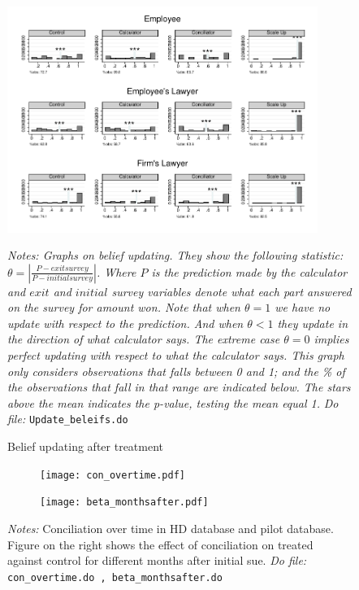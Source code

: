 \documentclass[11pt]{article}
\begin{document}
\begin{figure}[H]
    \caption{Belief updating after treatment}
    \label{Figure_updating}
     \begin{center}
        \includegraphics[width=0.9\textwidth]{updatebeleif_amount.pdf}
        \end{center}
     \footnotesize \textit{Notes: Graphs on belief updating. They show the following statistic: $\theta=\left|\frac{P-exitsurvey}{P-initialsurvey}\right|$. Where $P$ is the prediction made by the calculator and $exit$ and $initial$ survey variables denote what each part answered on the survey for amount won. Note that when $\theta=1$ we have no update with respect to the prediction. And when $\theta<1$ they update in the direction of what calculator says. The extreme case $\theta=0$ implies perfect updating with respect to what the calculator says. This graph only considers observations that falls between 0 and 1; and the \% of the observations that fall in that range are indicated below. The stars above the mean indicates the p-value, testing the mean equal 1.} 
      \footnotesize{ \textit{Do file: }  \texttt{Update\_beleifs.do}}
\end{figure}



      
\begin{figure}[H]
    \caption{Conciliation over time}
    \label{Figure_dynamicsConciliation}
    \begin{center}
    \begin{subfigure}{0.49\textwidth}
    \centering
        \texttt{[image: con\_overtime.pdf]}
     \end{subfigure}
        \begin{subfigure}{0.49\textwidth}    
         \centering
        \texttt{[image: beta\_monthsafter.pdf]}
     \end{subfigure}
        \end{center}
        {\footnotesize \textit{Notes: } Conciliation over time in HD database and pilot database. Figure on the right shows the effect of conciliation on treated against control for different months after initial sue.}
        {\footnotesize \textit{Do file: } \texttt{con\_overtime.do , beta\_monthsafter.do}}
\end{figure}
\end{document}
